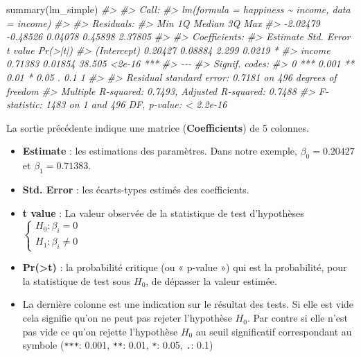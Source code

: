 \documentclass[
]{book}
\newenvironment{Shaded}{\begin{snugshade}}{\end{snugshade}}
\newcommand{\CommentTok}[1]{\textcolor[rgb]{0.56,0.35,0.01}{\textit{#1}}}
\newcommand{\FunctionTok}[1]{\textcolor[rgb]{0.00,0.00,0.00}{#1}}
\newcommand{\NormalTok}[1]{#1}
\begin{document}
\begin{Shaded}
\begin{Highlighting}[]
\FunctionTok{summary}\NormalTok{(lm\_simple)}
\CommentTok{\#\textgreater{} }
\CommentTok{\#\textgreater{} Call:}
\CommentTok{\#\textgreater{} lm(formula = happiness \textasciitilde{} income, data = income)}
\CommentTok{\#\textgreater{} }
\CommentTok{\#\textgreater{} Residuals:}
\CommentTok{\#\textgreater{}      Min       1Q   Median       3Q      Max }
\CommentTok{\#\textgreater{} {-}2.02479 {-}0.48526  0.04078  0.45898  2.37805 }
\CommentTok{\#\textgreater{} }
\CommentTok{\#\textgreater{} Coefficients:}
\CommentTok{\#\textgreater{}             Estimate Std. Error t value Pr(\textgreater{}|t|)    }
\CommentTok{\#\textgreater{} (Intercept)  0.20427    0.08884   2.299   0.0219 *  }
\CommentTok{\#\textgreater{} income       0.71383    0.01854  38.505   \textless{}2e{-}16 ***}
\CommentTok{\#\textgreater{} {-}{-}{-}}
\CommentTok{\#\textgreater{} Signif. codes:  }
\CommentTok{\#\textgreater{} 0 \textquotesingle{}***\textquotesingle{} 0.001 \textquotesingle{}**\textquotesingle{} 0.01 \textquotesingle{}*\textquotesingle{} 0.05 \textquotesingle{}.\textquotesingle{} 0.1 \textquotesingle{} \textquotesingle{} 1}
\CommentTok{\#\textgreater{} }
\CommentTok{\#\textgreater{} Residual standard error: 0.7181 on 496 degrees of freedom}
\CommentTok{\#\textgreater{} Multiple R{-}squared:  0.7493, Adjusted R{-}squared:  0.7488 }
\CommentTok{\#\textgreater{} F{-}statistic:  1483 on 1 and 496 DF,  p{-}value: \textless{} 2.2e{-}16}
\end{Highlighting}
\end{Shaded}

La sortie précédente indique une matrice (\textbf{Coefficients}) de 5
colonnes.

\begin{itemize}
\item
  \textbf{Estimate} : les estimations des paramètres. Dans notre exemple,
  \(\beta_0 = 0.20427\) et \(\beta_1 = 0.71383\).
\item
  \textbf{Std. Error} : les écarts-types estimés des coefficients.
\item
  \textbf{t value} : La valeur observée de la statistique de test
  d'hypothèses
  \(\begin{cases} H_0: \beta_i = 0 \\ H_1: \beta_i \neq 0 \end{cases}\)
\item
  \textbf{Pr(\textgreater\textbar t\textbar)} : la probabilité critique (ou « p-value ») qui est la
  probabilité, pour la statistique de test sous \(H_0\), de dépasser la
  valeur estimée.
\item
  La dernière colonne est une indication sur le résultat des tests. Si
  elle est vide cela signifie qu'on ne peut pas rejeter l'hypothèse
  \(H_0\). Par contre si elle n'est pas vide ce qu'on rejette
  l'hypothèse \(H_0\) au seuil significatif correspondant au symbole
  (\texttt{***}: 0.001, \texttt{**}: 0.01, \texttt{*}: 0.05, \texttt{.}: 0.1)
\end{itemize}
\end{document}

